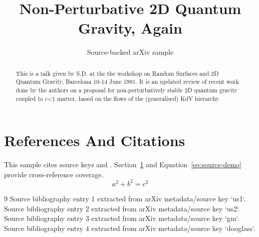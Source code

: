 \documentclass[11pt]{article}
\title{Non-Perturbative 2D Quantum Gravity, Again}
\author{Source-backed arXiv sample}
\date{}
\begin{document}
\maketitle
\begin{abstract}
This is a talk given by S.D. at the the workshop on Random Surfaces and 2D Quantum Gravity, Barcelona 10-14 June 1991. It is an updated review of recent work done by the authors on a proposal for non-perturbatively stable 2D quantum gravity coupled to c<1 matter, based on the flows of the (generalised) KdV hierarchy.
\end{abstract}
\section{References And Citations}
\label{sec:refs}
This sample cites source keys \cite{us1} and \cite{us2}. Section~\ref{sec:refs} and Equation~\ref{eq:source-demo} provide cross-reference coverage.
\begin{equation}
\label{eq:source-demo}
a^2 + b^2 = c^2
\end{equation}
\begin{thebibliography}{9}
 Source bibliography entry 1 extracted from arXiv metadata/source key `us1`.
 Source bibliography entry 2 extracted from arXiv metadata/source key `us2`.
 Source bibliography entry 3 extracted from arXiv metadata/source key `gm`.
 Source bibliography entry 4 extracted from arXiv metadata/source key `dooglass`.
\end{thebibliography}
\end{document}
